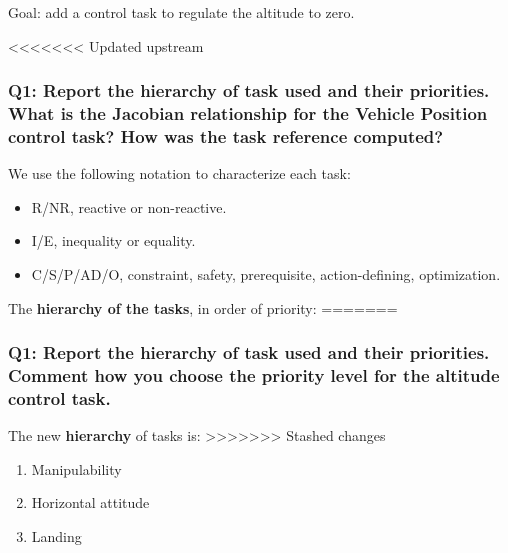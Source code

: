 \documentclass{article}
\begin{document}
Goal: add a control task to regulate the altitude to zero.

<<<<<<< Updated upstream

\subsubsection{Q1: Report the hierarchy of task used and their priorities. What is the Jacobian relationship for the Vehicle Position control task? How was the task reference computed?}

We use the following notation to characterize each task:
\begin{itemize}
    \item R/NR, reactive or non-reactive.
    \item I/E, inequality or equality.
    \item C/S/P/AD/O, constraint, safety, prerequisite, action-defining, optimization.
\end{itemize}

\noindent
The \textbf{hierarchy of the tasks}, in order of priority:
=======
\subsubsection{Q1: Report the hierarchy of task used and their priorities. Comment how you choose the priority level for the altitude control task.}

\noindent
\vspace{5px}
The new \textbf{hierarchy} of tasks is:
>>>>>>> Stashed changes
\begin{enumerate}
	\item Manipulability
	\item Horizontal attitude
	\item Landing
\end{enumerate}
\end{document}
